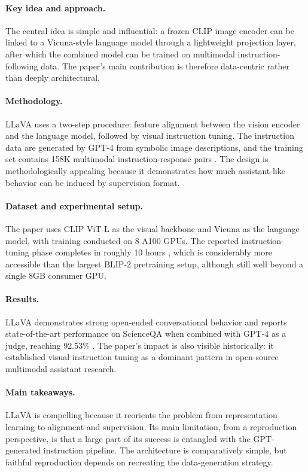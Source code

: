 \documentclass[11pt]{article}
\begin{document}
\paragraph{Key idea and approach.}
The central idea is simple and influential: a frozen CLIP image encoder can be linked
to a Vicuna-style language model through a lightweight projection layer, after which
the combined model can be trained on multimodal instruction-following data. The paper's
main contribution is therefore data-centric rather than deeply architectural.

\paragraph{Methodology.}
LLaVA uses a two-step procedure: feature alignment between the vision encoder and the
language model, followed by visual instruction tuning. The instruction data are
generated by GPT-4 from symbolic image descriptions, and the training set contains
158K multimodal instruction-response pairs \citep{liu2023visual}. The design is
methodologically appealing because it demonstrates how much assistant-like behavior can
be induced by supervision format.

\paragraph{Dataset and experimental setup.}
The paper uses CLIP ViT-L as the visual backbone and Vicuna as the language model, with
training conducted on 8 A100 GPUs. The reported instruction-tuning phase completes in
roughly 10 hours \citep{liu2023visual}, which is considerably more accessible than the
largest BLIP-2 pretraining setup, although still well beyond a single 8GB consumer GPU.

\paragraph{Results.}
LLaVA demonstrates strong open-ended conversational behavior and reports state-of-the-art
performance on ScienceQA when combined with GPT-4 as a judge, reaching 92.53\%
\citep{liu2023visual}. The paper's impact is also visible historically: it established
visual instruction tuning as a dominant pattern in open-source multimodal assistant
research.

\paragraph{Main takeaways.}
LLaVA is compelling because it reorients the problem from representation learning to
alignment and supervision. Its main limitation, from a reproduction perspective, is
that a large part of its success is entangled with the GPT-generated instruction
pipeline. The architecture is comparatively simple, but faithful reproduction depends on
recreating the data-generation strategy.
\end{document}
